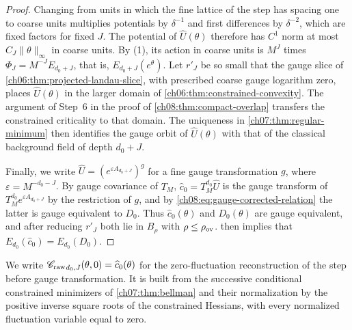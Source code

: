\begin{proof}
Changing from units in which the fine lattice of the step has spacing one to coarse units multiplies potentials by $\delta^{-1}$ and first differences by $\delta^{-2}$, which are fixed factors for fixed $J$. The potential of $\widehat U(\theta)$ therefore has $C^1$ norm at most $C_J\|\theta\|_\infty$ in coarse units. By (1), its action in coarse units is $M^J$ times $\Phi_J=M^{-J}E_{d_0+J}$, that is, $E_{d_0+J}(e^\theta)$. Let $r'_J$ be so small that the gauge slice of \cref{ch06:thm:projected-landau-slice}, with prescribed coarse gauge logarithm zero, places $\widehat U(\theta)$ in the larger domain of \cref{ch06:thm:constrained-convexity}. The argument of Step~6 in the proof of \cref{ch08:thm:compact-overlap} transfers the constrained criticality to that domain. The uniqueness in \cref{ch07:thm:regular-minimum} then identifies the gauge orbit of $\widehat U(\theta)$ with that of the classical background field of depth $d_0+J$.

Finally, we write $\widehat U=(e^{\varepsilon A_{d_0+J}})^g$ for a fine gauge transformation $g$, where $\varepsilon=M^{-d_0-J}$. By gauge covariance of $T_M$, $\widehat c_0=T_M^{d_0}\widehat U$ is the gauge transform of $T_M^{d_0}e^{\varepsilon A_{d_0+J}}$ by the restriction of $g$, and by \eqref{ch08:eq:gauge-corrected-relation} the latter is gauge equivalent to $D_0$. Thus $\widehat c_0(\theta)$ and $D_0(\theta)$ are gauge equivalent, and after reducing $r'_J$ both lie in $B_{\rho}$ with $\rho\le\rho_{\rm ov}$.  then implies that $E_{d_0}(\widehat c_0)=E_{d_0}(D_0)$.
\end{proof}

We write ${\mathscr C_{\mathrm{raw}}}_{d_0,J}(\theta,0)=\widehat c_0(\theta)$ for the zero-fluctuation reconstruction of the step before gauge transformation. It is built from the successive conditional constrained minimizers of \cref{ch07:thm:bellman} and their normalization by the positive inverse square roots of the constrained Hessians, with every normalized fluctuation variable equal to zero.

